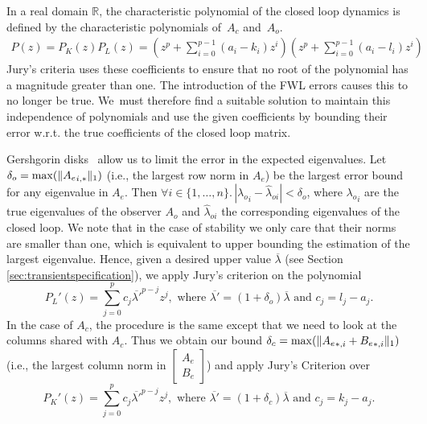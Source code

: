 \documentclass[a4paper,UKenglish]{lipics-v2018}
\DeclarePairedDelimiter\norm{\lVert}{\rVert}
\newcommand{\mat}[1]{{#1}}
\newcommand{\note}[1]{\textcolor{red}{[#1]}}
\begin{document}
In a real domain $\mathbb{R}$, the characteristic polynomial of the closed
loop dynamics is defined by the characteristic polynomials of~$\mat{A}_c$
and~$\mat{A}_o$.
%
\begin{align*}
P(z)=P_K(z)P_L(z)=\left(z^p+\sum_{i=0}^{p-1}{(a_i-k_i)z^{i}}\right) \left(z^p+\sum_{i=0}^{p-1}{(a_i-l_i)z^{i}}\right)
\end{align*}
%
Jury's criteria uses these coefficients to ensure that no root of the
polynomial has a magnitude greater than one.
%
%
The introduction of the FWL errors causes this to no longer be true. 
We~must therefore find a suitable solution to maintain this independence of
polynomials and use the given coefficients by bounding their error w.r.t. 
the true coefficients of the closed loop matrix.

Gershgorin disks~\cite{van1996matrix} allow us to limit the error in the
expected eigenvalues.  Let $\delta_o=\max(\norm{{\mat{A}_e}_{i,*}}_1)$
(i.e., the largest row norm in $\mat{A}_e$) be the largest error bound
for any eigenvalue in $\mat{A}_e$.  Then $\forall i \in \{1, \ldots,n\}.\,
|{\lambda_o}_{i}-\hat{\lambda}_{oi}|<\delta_o$, where ${\lambda_o}_{i}$ are
the true eigenvalues of the observer $\mat{A}_o$ and $\hat{\lambda}_{oi}$
the corresponding eigenvalues of the closed loop.  We note that in the case
of stability we only care that their norms are smaller than one, which is
equivalent to upper bounding the estimation of the largest eigenvalue. 
Hence, given a desired upper value $\overline{\lambda}$ (see Section
\ref{sec:transientspecification}), we apply Jury's criterion on the
polynomial
%
\begin{equation}
P_L'(z)=\sum_{j=0}^p c_j\overline{\lambda'}^{p-j}z^j, \text{ where }  \overline{\lambda'}=(1+\delta_o)\overline{\lambda} \text{ and } c_j=l_j-a_j.
\end{equation}
%
In the case of $\mat{A}_c$, the procedure is the same except that we need to
look at the columns shared with $\mat{A}_c$.  Thus we obtain our bound
$\delta_c=\max(\norm{{\mat{A}_e}_{*,i}+{\mat{B}_e}_{*,i}}_1)$ (i.e.,
the largest column norm in $ \left[\begin{array}{c}\mat{A}_e\\
\mat{B}_e\end{array}\right]$) and apply Jury's Criterion over
%
\begin{equation}
P_K'(z)=\sum_{j=0}^p c_j\overline{\lambda'}^{p-j}z^j, \text{ where }  \overline{\lambda'}=(1+\delta_c)\overline{\lambda} \text{ and } c_j=k_j-a_j.
\end{equation}
\end{document}
